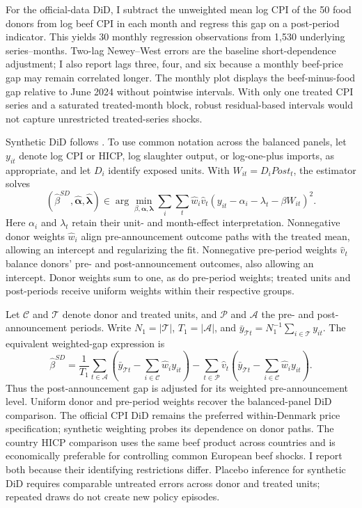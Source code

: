 \documentclass[11pt]{article}
\begin{document}
For the official-data DiD, I subtract the unweighted mean log CPI of the 50 food donors from log beef CPI in each month and regress this gap on a post-period indicator. This yields 30 monthly regression observations from 1,530 underlying series--months. Two-lag Newey--West errors are the baseline short-dependence adjustment; I also report lags three, four, and six because a monthly beef-price gap may remain correlated longer. The monthly plot displays the beef-minus-food gap relative to June 2024 without pointwise intervals. With only one treated CPI series and a saturated treated-month block, robust residual-based intervals would not capture unrestricted treated-series shocks.

Synthetic DiD follows \citet{arkhangelsky2021synthetic}. To use common notation across the balanced panels, let $y_{it}$ denote log CPI or HICP, log slaughter output, or log-one-plus imports, as appropriate, and let $D_i$ identify exposed units. With $W_{it}=D_i Post_t$, the estimator solves
\begin{equation}\label{eq:sdid_wls}
(\widehat\beta^{SD},\widehat{\boldsymbol\alpha},\widehat{\boldsymbol\lambda})
\in\arg\min_{\beta,\boldsymbol\alpha,\boldsymbol\lambda}
\sum_i\sum_t\widehat w_i\widehat v_t
\left(y_{it}-\alpha_i-\lambda_t-\beta W_{it}\right)^2.
\end{equation}
Here $\alpha_i$ and $\lambda_t$ retain their unit- and month-effect interpretation. Nonnegative donor weights $\widehat w_i$ align pre-announcement outcome paths with the treated mean, allowing an intercept and regularizing the fit. Nonnegative pre-period weights $\widehat v_t$ balance donors' pre- and post-announcement outcomes, also allowing an intercept. Donor weights sum to one, as do pre-period weights; treated units and post-periods receive uniform weights within their respective groups.

Let $\mathcal C$ and $\mathcal T$ denote donor and treated units, and $\mathcal P$ and $\mathcal A$ the pre- and post-announcement periods. Write $N_1=|\mathcal T|$, $T_1=|\mathcal A|$, and $\bar y_{\mathcal Tt}=N_1^{-1}\sum_{i\in\mathcal T}y_{it}$. The equivalent weighted-gap expression is
\begin{equation}\label{eq:sdid_gap}
\widehat\beta^{SD}
=\frac{1}{T_1}\sum_{t\in\mathcal A}\left(\bar y_{\mathcal Tt}-\sum_{i\in\mathcal C}\widehat w_i y_{it}\right)
-\sum_{t\in\mathcal P}\widehat v_t\left(\bar y_{\mathcal Tt}-\sum_{i\in\mathcal C}\widehat w_i y_{it}\right).
\end{equation}
Thus the post-announcement gap is adjusted for its weighted pre-announcement level. Uniform donor and pre-period weights recover the balanced-panel DiD comparison. The official CPI DiD remains the preferred within-Denmark price specification; synthetic weighting probes its dependence on donor paths. The country HICP comparison uses the same beef product across countries and is economically preferable for controlling common European beef shocks. I report both because their identifying restrictions differ. Placebo inference for synthetic DiD requires comparable untreated errors across donor and treated units; repeated draws do not create new policy episodes.
\end{document}
